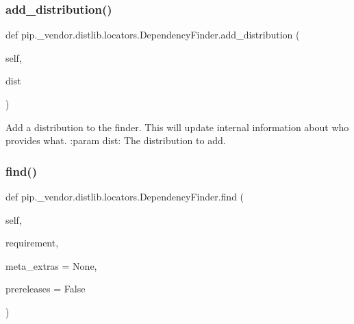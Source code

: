 \subsubsection{\texorpdfstring{add\+\_\+distribution()}{add\_distribution()}}
{\footnotesize\ttfamily def pip.\+\_\+vendor.\+distlib.\+locators.\+Dependency\+Finder.\+add\+\_\+distribution (\begin{DoxyParamCaption}\item[{}]{self,  }\item[{}]{dist }\end{DoxyParamCaption})}

\begin{DoxyVerb}Add a distribution to the finder. This will update internal information
about who provides what.
:param dist: The distribution to add.
\end{DoxyVerb}
 \mbox{\label{classpip_1_1__vendor_1_1distlib_1_1locators_1_1DependencyFinder_a5819c2bb2cd8f2467194e31cd08e7269}} 
\subsubsection{\texorpdfstring{find()}{find()}}
{\footnotesize\ttfamily def pip.\+\_\+vendor.\+distlib.\+locators.\+Dependency\+Finder.\+find (\begin{DoxyParamCaption}\item[{}]{self,  }\item[{}]{requirement,  }\item[{}]{meta\+\_\+extras = {\ttfamily None},  }\item[{}]{prereleases = {\ttfamily False} }\end{DoxyParamCaption})}

